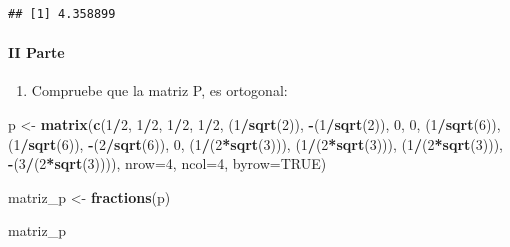 \documentclass[]{article}
\newenvironment{Shaded}{\begin{snugshade}}{\end{snugshade}}
\newcommand{\DataTypeTok}[1]{\textcolor[rgb]{0.13,0.29,0.53}{#1}}
\newcommand{\DecValTok}[1]{\textcolor[rgb]{0.00,0.00,0.81}{#1}}
\newcommand{\KeywordTok}[1]{\textcolor[rgb]{0.13,0.29,0.53}{\textbf{#1}}}
\newcommand{\NormalTok}[1]{#1}
\newcommand{\OperatorTok}[1]{\textcolor[rgb]{0.81,0.36,0.00}{\textbf{#1}}}
\newcommand{\OtherTok}[1]{\textcolor[rgb]{0.56,0.35,0.01}{#1}}
\newcommand{\StringTok}[1]{\textcolor[rgb]{0.31,0.60,0.02}{#1}}
\providecommand{\tightlist}{%
  \setlength{\itemsep}{0pt}\setlength{\parskip}{0pt}}
\let\oldparagraph\paragraph
\renewcommand{\paragraph}[1]{\oldparagraph{#1}\mbox{}}
\begin{document}
\begin{verbatim}
## [1] 4.358899
\end{verbatim}

\hypertarget{ii-parte}{%
\paragraph{II Parte}\label{ii-parte}}

\begin{enumerate}
\def\labelenumi{\arabic{enumi}.}
\tightlist
\item
  Compruebe que la matriz P, es ortogonal:
\end{enumerate}

\begin{Shaded}
\begin{Highlighting}[]
\NormalTok{p <-}\StringTok{ }\KeywordTok{matrix}\NormalTok{(}\KeywordTok{c}\NormalTok{(}\DecValTok{1}\OperatorTok{/}\DecValTok{2}\NormalTok{, }\DecValTok{1}\OperatorTok{/}\DecValTok{2}\NormalTok{, }\DecValTok{1}\OperatorTok{/}\DecValTok{2}\NormalTok{, }\DecValTok{1}\OperatorTok{/}\DecValTok{2}\NormalTok{, }
\NormalTok{              (}\DecValTok{1}\OperatorTok{/}\KeywordTok{sqrt}\NormalTok{(}\DecValTok{2}\NormalTok{)), }\OperatorTok{-}\NormalTok{(}\DecValTok{1}\OperatorTok{/}\KeywordTok{sqrt}\NormalTok{(}\DecValTok{2}\NormalTok{)), }\DecValTok{0}\NormalTok{, }\DecValTok{0}\NormalTok{, }
\NormalTok{              (}\DecValTok{1}\OperatorTok{/}\KeywordTok{sqrt}\NormalTok{(}\DecValTok{6}\NormalTok{)), (}\DecValTok{1}\OperatorTok{/}\KeywordTok{sqrt}\NormalTok{(}\DecValTok{6}\NormalTok{)), }\OperatorTok{-}\NormalTok{(}\DecValTok{2}\OperatorTok{/}\KeywordTok{sqrt}\NormalTok{(}\DecValTok{6}\NormalTok{)), }\DecValTok{0}\NormalTok{, }
\NormalTok{              (}\DecValTok{1}\OperatorTok{/}\NormalTok{(}\DecValTok{2}\OperatorTok{*}\KeywordTok{sqrt}\NormalTok{(}\DecValTok{3}\NormalTok{))), (}\DecValTok{1}\OperatorTok{/}\NormalTok{(}\DecValTok{2}\OperatorTok{*}\KeywordTok{sqrt}\NormalTok{(}\DecValTok{3}\NormalTok{))), (}\DecValTok{1}\OperatorTok{/}\NormalTok{(}\DecValTok{2}\OperatorTok{*}\KeywordTok{sqrt}\NormalTok{(}\DecValTok{3}\NormalTok{))), }\OperatorTok{-}\NormalTok{(}\DecValTok{3}\OperatorTok{/}\NormalTok{(}\DecValTok{2}\OperatorTok{*}\KeywordTok{sqrt}\NormalTok{(}\DecValTok{3}\NormalTok{)))), }
              \DataTypeTok{nrow=}\DecValTok{4}\NormalTok{, }\DataTypeTok{ncol=}\DecValTok{4}\NormalTok{, }\DataTypeTok{byrow=}\OtherTok{TRUE}\NormalTok{)}

\NormalTok{matriz_p <-}\StringTok{ }\KeywordTok{fractions}\NormalTok{(p)}

\NormalTok{matriz_p}
\end{Highlighting}
\end{Shaded}
\end{document}
